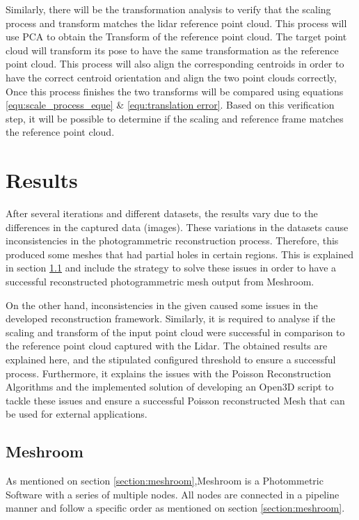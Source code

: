 \documentclass[12pt]{report}
\begin{document}
Similarly,  there will be the transformation analysis to verify that the scaling process and transform matches the lidar reference point cloud.
This process will use PCA to obtain the Transform of the reference point cloud.
The target point cloud will transform its pose to have the same transformation as the reference point cloud. This process will also align the corresponding centroids in order to have the correct centroid orientation and align the two point clouds correctly,
Once this process finishes the two transforms will be compared using equations \ref{equ:scale_process_eque} \& \ref{equ:translation error}.
Based on this verification step, it will be possible to determine if the scaling and reference frame matches the reference point cloud.
















\newpage
\chapter{Results}
After several iterations and different datasets, the results vary due to the differences in the captured data (images). 
These variations in the datasets cause inconsistencies in the photogrammetric reconstruction process. Therefore, this produced some meshes that had partial holes in certain regions.
This is explained in section \ref{section:meshroom_results} and include the strategy to solve these issues in order to have a successful reconstructed photogrammetric mesh output from Meshroom.

On the other hand, inconsistencies in the given caused some issues in the developed reconstruction framework.
Similarly, it is required to analyse if the scaling and transform of the input point cloud were successful in comparison to the reference point cloud captured with the Lidar. 
The obtained results are explained here, and the stipulated configured threshold to ensure a successful process.
Furthermore, it explains the issues with the Poisson Reconstruction Algorithms and the implemented solution of developing an Open3D script to tackle these issues and ensure a successful Poisson reconstructed Mesh that can be used for external applications. 



\section{Meshroom}
\label{section:meshroom_results}
As mentioned on section \ref{section:meshroom},Meshroom is a Photommetric Software with a series of multiple nodes. All  nodes are connected in a pipeline manner and follow a specific order as mentioned on section \ref{section:meshroom}.
\end{document}
